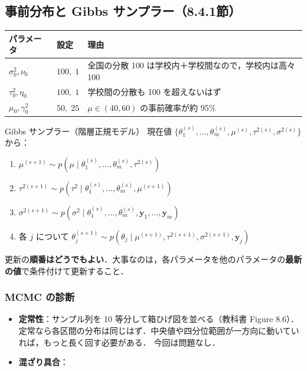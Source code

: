 \documentclass[lualatex,ja=standard,a4paper,12pt]{bxjsarticle}
\begin{document}
\subsection{事前分布と Gibbs サンプラー（8.4.1節）}

\begin{center}
\renewcommand{\arraystretch}{1.4}
\begin{tabular}{lll}
\toprule
パラメータ & 設定 & 理由 \\
\midrule
$\sigma_0^2, \nu_0$ & $100,\; 1$ & 全国の分散 100 は学校内＋学校間なので，学校内は高々 100 \\
$\tau_0^2, \eta_0$ & $100,\; 1$ & 学校間の分散も 100 を超えないはず \\
$\mu_0, \gamma_0^2$ & $50,\; 25$ & $\mu \in (40, 60)$ の事前確率が約 95\% \\
\bottomrule
\end{tabular}
\end{center}

\begin{algobox}{Gibbs サンプラー（階層正規モデル）}
現在値 $\{\theta_1^{(s)}, \ldots, \theta_m^{(s)}, \mu^{(s)}, \tau^{2(s)}, \sigma^{2(s)}\}$ から：
\begin{enumerate}
  \item $\mu^{(s+1)} \sim p(\mu \mid \theta_1^{(s)}, \ldots, \theta_m^{(s)}, \tau^{2(s)})$
  \item $\tau^{2(s+1)} \sim p(\tau^2 \mid \theta_1^{(s)}, \ldots, \theta_m^{(s)}, \mu^{(s+1)})$
  \item $\sigma^{2(s+1)} \sim p(\sigma^2 \mid \theta_1^{(s)}, \ldots, \theta_m^{(s)}, \bm{y}_1, \ldots, \bm{y}_m)$
  \item 各 $j$ について $\theta_j^{(s+1)} \sim p(\theta_j \mid \mu^{(s+1)}, \tau^{2(s+1)}, \sigma^{2(s+1)}, \bm{y}_j)$
\end{enumerate}
更新の\textbf{順番はどうでもよい}．大事なのは，各パラメータを他のパラメータの\textbf{最新の値}で条件付けて更新すること．
\end{algobox}

\subsubsection*{MCMC の診断}

\begin{itemize}
  \item \textbf{定常性}：サンプル列を 10 等分して箱ひげ図を並べる（教科書 Figure 8.6）．
        定常なら各区間の分布は同じはず．中央値や四分位範囲が一方向に動いていれば，もっと長く回す必要がある．
        今回は問題なし．
  \item \textbf{混ざり具合}：
\end{itemize}
\end{document}
